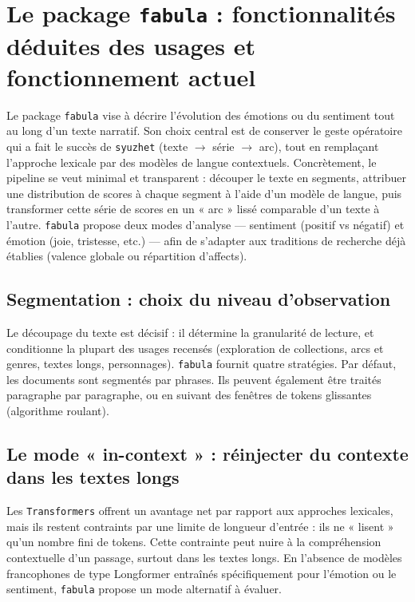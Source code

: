 \documentclass[fra, final]{anthology-ch}      %
\begin{document}
\section{Le package \texttt{fabula} : fonctionnalités déduites des usages et fonctionnement actuel}

Le package \texttt{fabula} vise à décrire l’évolution des émotions ou du sentiment tout au long d’un texte narratif. Son choix central est de conserver le geste opératoire qui a fait le succès de \texttt{syuzhet} (texte $\rightarrow$ série $\rightarrow$ arc), tout en remplaçant l’approche lexicale par des modèles de langue contextuels. Concrètement, le pipeline se veut minimal et transparent : découper le texte en segments, attribuer une distribution de scores à chaque segment à l’aide d’un modèle de langue, puis transformer cette série de scores en un « arc » lissé comparable d’un texte à l’autre. \texttt{fabula} propose deux modes d’analyse — sentiment (positif vs négatif) et émotion (joie, tristesse, etc.) — afin de s’adapter aux traditions de recherche déjà établies (valence globale ou répartition d’affects).


\subsection{Segmentation : choix du niveau d’observation}

Le découpage du texte est décisif : il détermine la granularité de lecture, et conditionne la plupart des usages recensés (exploration de collections, arcs et genres, textes longs, personnages). \texttt{fabula} fournit quatre stratégies. Par défaut, les documents sont segmentés par phrases. Ils peuvent également être traités paragraphe par paragraphe, ou en suivant des fenêtres de tokens glissantes (algorithme roulant).

\subsection{Le mode « in-context » : réinjecter du contexte dans les textes longs}

Les \texttt{Transformers} offrent un avantage net par rapport aux approches lexicales, mais ils restent contraints par une limite de longueur d’entrée : ils ne « lisent » qu’un nombre fini de tokens. Cette contrainte peut nuire à la compréhension contextuelle d’un passage, surtout dans les textes longs. En l’absence de modèles francophones de type Longformer entraînés spécifiquement pour l’émotion ou le sentiment, \texttt{fabula} propose un mode alternatif à évaluer.
\end{document}
